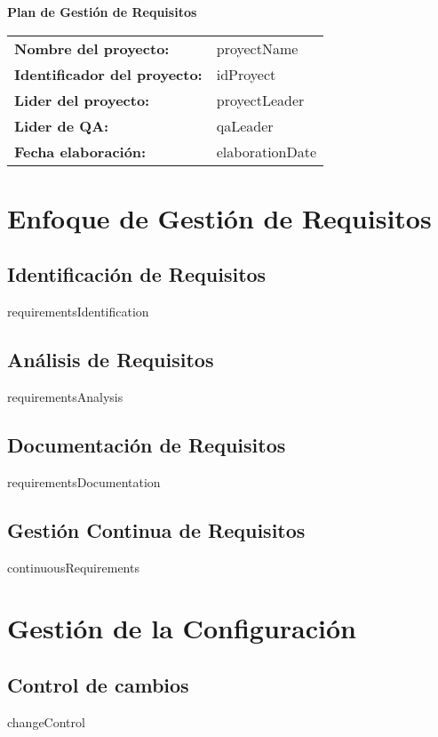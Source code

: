 \documentclass{article}
\begin{document}
    \begin{center}
    {\huge\textbf{Plan de Gestión de Requisitos}}\\[1cm]
    \end{center}

    \renewcommand{\arraystretch}{1.5}

    \begin{tabular}{|ll|} \hline
    \rowcolor{gray!10}\textbf{Nombre del proyecto:} & {{proyectName}} \\[0.3cm]
    \textbf{Identificador del proyecto:} & {{idProyect}} \\[0.3cm]
    \textbf{Lider del proyecto:} & {{proyectLeader}} \\[0.3cm]
    \textbf{Lider de QA:} & {{qaLeader}} \\[0.3cm]
    \textbf{Fecha elaboración:} & {{elaborationDate}} \\ \hline
    \end{tabular}

    \newpage
    
    \tableofcontents
    \newpage
    
    \section{Enfoque de Gestión de Requisitos}
    \subsection{Identificación de Requisitos}
    {{requirementsIdentification}}
    \subsection{Análisis de Requisitos}
    {{requirementsAnalysis}}
    \subsection{Documentación de Requisitos}
    {{requirementsDocumentation}}
    \subsection{Gestión Continua de Requisitos}
    {{continuousRequirements}}
    
    \section{Gestión de la Configuración}
    \subsection{Control de cambios}
    {{changeControl}}
    
\end{document}
